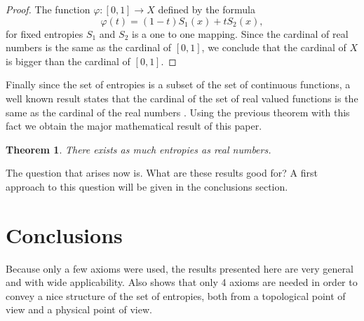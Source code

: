 \documentclass[11pt]{article}
\theoremstyle{plain}
\newtheorem{theorem}{Theorem}[section]
\begin{document}
\begin{proof}
The function $\varphi:[0,1]\rightarrow X$ defined by the formula 
\begin{equation}
\varphi(t)= (1-t)S_{1}(x)+tS_{2}(x), 
\end{equation}
for fixed entropies $S_{1}$ and $S_{2}$ is a one to one mapping. Since the cardinal of real numbers is the same as the cardinal of $[0,1]$, we conclude that the cardinal of $X$ is bigger than the cardinal of $[0,1]$.
\end{proof}
Finally since the set of entropies is a subset of the set of continuous functions, a well known result states that the cardinal of the set of real valued functions is the same as the cardinal of the real numbers \cite{Settheory}. Using the previous theorem with this fact we obtain the major mathematical result of this paper.

\begin{theorem}
There exists as much entropies as real numbers.
\end{theorem}

The question that arises now is. What are these results  good for? A first approach to this question will be given in the conclusions section.
\section{Conclusions}

Because only a few axioms were used, the results presented here are
very general and with wide applicability. Also shows that only 4 axioms are needed in order to convey a nice structure of the set of entropies, both from a
topological point of view and  a physical point of view.
\end{document}
